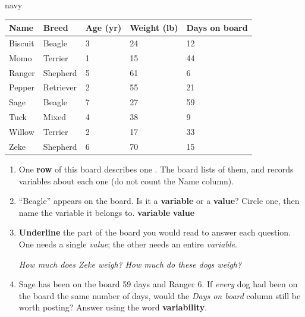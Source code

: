 \documentclass[10pt]{article}
\newcommand{\answerspace}[2]{\par\nopagebreak\noindent\begin{minipage}[t][#1][t]{\linewidth}%
  \color{keyred}\bfseries #2\end{minipage}\par}
\begin{document}
\boxguard[30]
\begin{scenariobox}{navy}
\small
\renewcommand{\arraystretch}{1.25}
\begin{tabularx}{\linewidth}{@{} l Y Y Y Y @{}}
\textbf{Name} & \textbf{Breed} & \textbf{Age (yr)} & \textbf{Weight (lb)} & \textbf{Days on board} \\
\hline
Biscuit & Beagle    & 3 & 24 & 12 \\
Momo    & Terrier   & 1 & 15 & 44 \\
Ranger  & Shepherd  & 5 & 61 &  6 \\
Pepper  & Retriever & 2 & 55 & 21 \\
Sage    & Beagle    & 7 & 27 & 59 \\
Tuck    & Mixed     & 4 & 38 &  9 \\
Willow  & Terrier   & 2 & 17 & 33 \\
Zeke    & Shepherd  & 6 & 70 & 15 \\
\hline
\end{tabularx}

\vspace{6pt}
\begin{enumerate}[label=\textbf{\alph*.}, leftmargin=1.8em, itemsep=7pt]
  \item One \textbf{row} of this board describes one \blank{3.0cm}. The board lists
        \blank{1.0cm} of them, and records \blank{1.0cm} variables about each one
        (do not count the Name column).
  \item ``Beagle'' appears on the board. Is it a \textbf{variable} or a \textbf{value}?
        Circle one, then name the variable it belongs to.
        \hfill \textbf{variable} \qquad \textbf{value}
        \answerspace{1.2cm}{}
  \item \textbf{Underline} the part of the board you would read to answer each question. One
        needs a single \emph{value}; the other needs an entire \emph{variable}.

        \vspace{3pt}
        \emph{How much does Zeke weigh?} \qquad\qquad \emph{How much do these dogs weigh?}
        \answerspace{1.4cm}{}
  \item Sage has been on the board 59 days and Ranger 6. If \emph{every} dog had been on the
        board the same number of days, would the \emph{Days on board} column still be worth
        posting? Answer using the word \textbf{variability}.
        \answerspace{1.8cm}{}
\end{enumerate}
\end{scenariobox}
\end{document}
